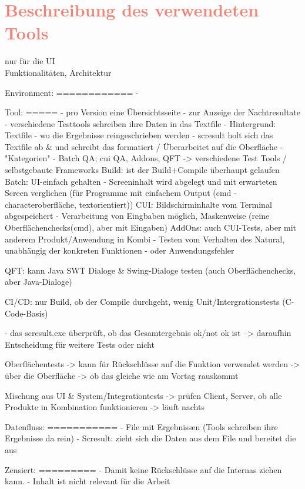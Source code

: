 \section{\textcolor{Salmon}{Beschreibung des verwendeten Tools}}
\label{ch:IST-Zustand:sec:Tool}

nur für die UI\\
Funktionalitäten, Architektur

Environment:
============
- 

Tool:
=====
- pro Version eine Übersichtsseite
- zur Anzeige der Nachtresultate
- verschiedene Testtools schreiben ihre Daten in das Textfile
- Hintergrund: Textfile - wo die Ergebnisse reingeschrieben werden
- scresult holt sich das Textfile ab \& und schreibt das formatiert / Überarbeitet auf die Oberfläche
- "Kategorien" - Batch QA; cui QA, Addons, QFT
-> verschiedene Test Tools / selbstgebaute Frameworks
Build: ist der Build+Compile überhaupt gelaufen
Batch: UI-einfach gehalten - Screeninhalt wird abgelegt und mit erwarteten Screen verglichen (für Programme mit einfachem Output (cmd - characteroberfläche, textorientiert))
CUI: Bildschirminhalte vom Terminal abgespeichert - Verarbeitung von Eingbaben möglich, Maskenweise (reine Oberflächenchecks(cmd), aber mit Eingaben)
AddOns: auch CUI-Tests, aber mit anderem Produkt/Anwendung in Kombi - Testen vom Verhalten des Natural, unabhängig der konkreten Funktionen - oder Anwendungsfehler

QFT: kann Java SWT Dialoge \& Swing-Dialoge testen (auch Oberflächenchecks, aber Java-Dialoge)

CI/CD: nur Build, ob der Compile durchgeht, wenig Unit/Intergrationstests (C-Code-Basis)

- das scresult.exe überprüft, ob das Gesamtergebnis ok/not ok ist
--> daraufhin Entscheidung für weitere Tests oder nicht

Oberflächentests
-> kann für Rückschlüsse auf die Funktion verwendet werden
-> über die Oberfläche
-> ob das gleiche wie am Vortag rauskommt

Mischung aus UI \& System/Integrationtests
-> prüfen Client, Server, ob alle Produkte in Kombination funktionieren
-> läuft nachts

Datenfluss:
===========
- File mit Ergebnissen (Tools schreiben ihre Ergebnisse da rein)
- Scresult: zieht sich die Daten aus dem File und bereitet die aus


Zensiert:
=========
- Damit keine Rückschlüsse auf die Internas ziehen kann.
- Inhalt ist nicht relevant für die Arbeit